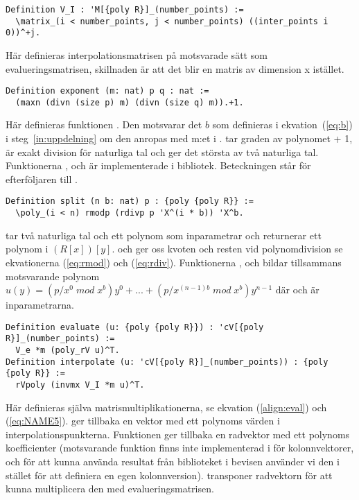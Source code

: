 \begin{lstlisting}
Definition V_I : 'M[{poly R}]_(number_points) :=
  \matrix_(i < number_points, j < number_points) ((inter_points i 0))^+j.
\end{lstlisting}

Här definieras interpolationsmatrisen på motsvarade sätt som
evalueringsmatrisen, skillnaden är att det blir en matris av dimension
 x  istället.

\begin{lstlisting}
Definition exponent (m: nat) p q : nat :=
  (maxn (divn (size p) m) (divn (size q) m)).+1.
\end{lstlisting}
Här definieras funktionen . Den motsvarar det $b$ som definieras i
ekvation~(\ref{eq:b}) i steg~\ref{in:uppdelning} om den anropas med m:et i
\toomm{}.  tar graden av polynomet  + 1,  är exakt
division för naturliga tal och  ger det största av två naturliga tal.
Funktionerna ,  och  är implementerade i \ssr
bibliotek. Beteckningen  står för efterföljaren till .

\begin{lstlisting}
Definition split (n b: nat) p : {poly {poly R}} :=
  \poly_(i < n) rmodp (rdivp p 'X^(i * b)) 'X^b.
\end{lstlisting}
 tar två naturliga tal och ett polynom som inparametrar och returnerar
ett polynom i $(R[x])[y]$.  och  ger oss kvoten och resten
vid polynomdivision se ekvationerna (\ref{eq:rmod}) och (\ref{eq:rdiv}).
Funktionerna ,  och  bildar tillsammans
motsvarande polynom
$u(y)=(p/x^0\;mod\;x^b)y^0+...+(p/x^{(n-1)b}\;mod\;x^b)y^{n-1}$ där  och
 är inparametrarna.

\begin{lstlisting}
Definition evaluate (u: {poly {poly R}}) : 'cV[{poly R}]_(number_points) :=
  V_e *m (poly_rV u)^T.
Definition interpolate (u: 'cV[{poly R}]_(number_points)) : {poly {poly R}} :=
  rVpoly (invmx V_I *m u)^T.
\end{lstlisting}

Här definieras själva matrismultiplikationerna, se ekvation (\ref{align:eval})
och (\ref{eq:NAME5}).  ger tillbaka en vektor med ett polynoms
värden i interpolationspunkterna. Funktionen  ger tillbaka en
radvektor med ett polynoms koefficienter (motsvarande funktion finns inte
implementerad i \ssr för kolonnvektorer, och för att kunna använda resultat
från biblioteket i bevisen använder vi den i stället för att definiera en egen
kolonnversion).  transponer radvektorn för att kunna multiplicera den med
evalueringsmatrisen.

